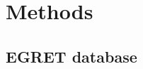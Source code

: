 \documentclass{article}
\begin{document}
\renewcommand{\bibname}{References}%




\section*{Methods} %
\subsection*{EGRET database}
\end{document}
